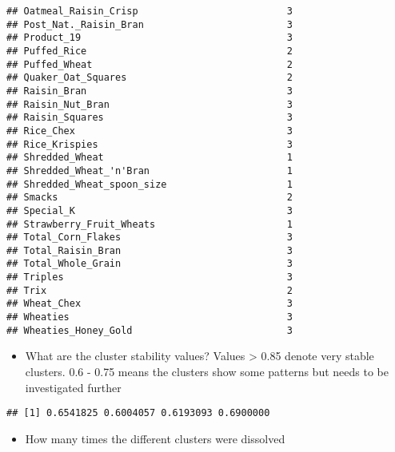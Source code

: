 \documentclass[
]{article}
\newenvironment{Shaded}{\begin{snugshade}}{\end{snugshade}}
\newcommand{\CommentTok}[1]{\textcolor[rgb]{0.56,0.35,0.01}{\textit{#1}}}
\newcommand{\NormalTok}[1]{#1}
\newcommand{\SpecialCharTok}[1]{\textcolor[rgb]{0.00,0.00,0.00}{#1}}
\providecommand{\tightlist}{%
  \setlength{\itemsep}{0pt}\setlength{\parskip}{0pt}}
\begin{document}
\begin{verbatim}
## Oatmeal_Raisin_Crisp                          3
## Post_Nat._Raisin_Bran                         3
## Product_19                                    3
## Puffed_Rice                                   2
## Puffed_Wheat                                  2
## Quaker_Oat_Squares                            2
## Raisin_Bran                                   3
## Raisin_Nut_Bran                               3
## Raisin_Squares                                3
## Rice_Chex                                     3
## Rice_Krispies                                 3
## Shredded_Wheat                                1
## Shredded_Wheat_'n'Bran                        1
## Shredded_Wheat_spoon_size                     1
## Smacks                                        2
## Special_K                                     3
## Strawberry_Fruit_Wheats                       1
## Total_Corn_Flakes                             3
## Total_Raisin_Bran                             3
## Total_Whole_Grain                             3
## Triples                                       3
## Trix                                          2
## Wheat_Chex                                    3
## Wheaties                                      3
## Wheaties_Honey_Gold                           3
\end{verbatim}

\begin{itemize}
\tightlist
\item
  What are the cluster stability values? Values \textgreater{} 0.85
  denote very stable clusters. 0.6 - 0.75 means the clusters show some
  patterns but needs to be investigated further
\end{itemize}

\begin{Shaded}
\end{Shaded}

\begin{verbatim}
## [1] 0.6541825 0.6004057 0.6193093 0.6900000
\end{verbatim}

\begin{itemize}
\tightlist
\item
  How many times the different clusters were dissolved
\end{itemize}
\end{document}

